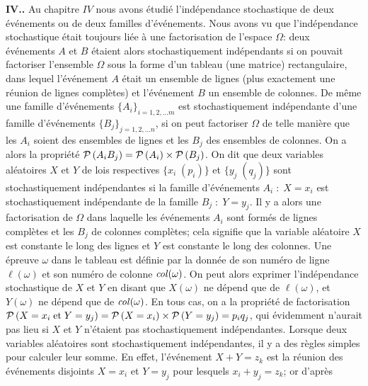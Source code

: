 {\bf IV\ata ..   }
\medskip
Au chapitre $IV$ nous avons \'etudi\'e l'ind\'ependance stochastique de 
deux \'ev\'enements ou de deux familles d'\'ev\'enements. Nous avons vu
que l'ind\'ependance stochastique \'etait toujours li\'ee \`a une
factorisation de l'espace $\Omega$: deux \'ev\'enements $A$ et $B$
\'etaient alors stochastiquement ind\'ependants si on pouvait factoriser
l'ensemble $\Omega$ sous la forme d'un tableau (une matrice)
rectangulaire, dans lequel l'\'ev\'enement $A$ \'etait un ensemble de 
 lignes (plus exactement une r\'eunion de lignes compl\`etes) et
l'\'ev\'enement $B$ un ensemble de colonnes. De m\^eme une famille
d'\'ev\'enements $\{ A_i \}_{i=1,2, \ldots m}$ est stochastiquement
ind\'ependante d'une famille d'\'ev\'enements $\{ B_j \}_{j=1,2, \ldots n}$,
si on peut factoriser $\Omega$ de telle mani\`ere que les $A_i$ soient  
des ensembles de lignes et les $B_j$ des ensembles de colonnes. On a  
alors la propri\'et\'e ${\cal P}\, (A_i B_j) = {\cal P}\, (A_i) \times {\cal
P}\, (B_j)$.  
\medskip
On dit que deux variables al\'eatoires $X$ et $Y$ de lois respectives 
$\{ x_i \; (p_i) \}$ et $\{ y_j \; (q_j) \}$ sont stochastiquement
ind\'ependantes si la famille d'\'ev\'enements $A_i \; : \; X = x_i$ est
stochastiquement ind\'ependante de la famille $B_j \; : \; Y = y_j$. Il y a
alors une factorisation de $\Omega$ dans laquelle les \'ev\'enements 
$A_i$ sont form\'es de lignes compl\`etes et les $B_j$ de colonnes
compl\`etes; cela signifie que la variable al\'eatoire $X$ est constante le
long des lignes et  $Y$ est constante le long des colonnes. Une \'epreuve
$\omega$ dans le tableau est d\'efinie par la donn\'ee de son num\'ero de
ligne $\ell (\omega )$ et son num\'ero de colonne ${\it col} (\omega )$. On
peut alors exprimer l'ind\'ependance stochastique de $X$ et $Y$ en disant
que $X (\omega )$ ne d\'epend que de $\ell  (\omega )$, et $Y  (\omega )$ ne
d\'epend que de ${\it col} (\omega )$. En tous cas, on a la propri\'et\'e de
factorisation  ${\cal P}\, (X = x_i \; {\rm et } \;  Y = y_j) = {\cal P}\, (X =
x_i) \times {\cal P}\, (Y = y_j) = p_i q_j$, qui \'evidemment n'aurait pas
lieu si $X$ et $Y$ n'\'etaient pas stochastiquement ind\'ependantes.
\medskip
Lorsque deux variables al\'eatoires sont stochastiquement ind\'ependantes, 
il y a des r\`egles simples pour calculer leur somme. En effet,
l'\'ev\'enement $X + Y = z_k$ est la r\'eunion des \'ev\'enements disjoints
$X = x_i$ et $Y = y_j$ pour lesquels $x_i + y_j = z_k$; or d'apr\`es
